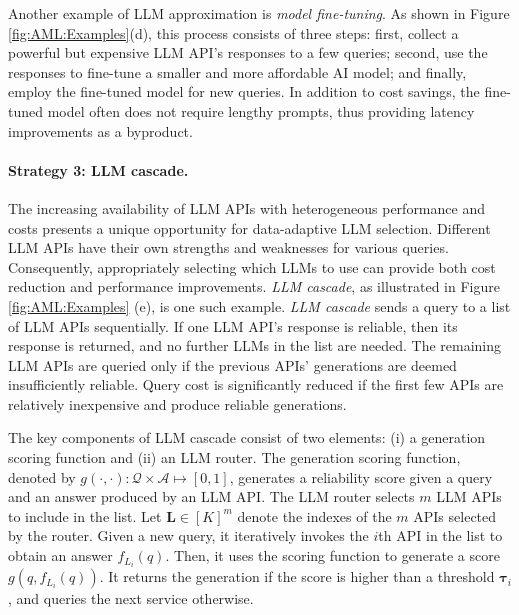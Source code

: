 \documentclass{article}
\numberwithin{equation}{section}
\newcommand{\query}{q}
\begin{document}
Another example of LLM approximation is \textit{model fine-tuning}. As shown in Figure \ref{fig:AML:Examples}(d), this process consists of three steps: first, collect a powerful but expensive LLM API's responses to a few queries; second, use the responses to fine-tune a smaller and more affordable AI model; and finally, employ the fine-tuned model for new queries. In addition to cost savings, the fine-tuned model often does not require lengthy prompts, thus providing latency improvements as a byproduct.


\paragraph{Strategy 3: LLM cascade.}
The increasing availability of LLM APIs with heterogeneous performance and costs presents a unique opportunity for data-adaptive LLM selection. Different LLM APIs have their own strengths and weaknesses for various queries. Consequently, appropriately selecting which LLMs to use can provide both cost reduction and performance improvements. \textit{LLM cascade}, as illustrated in Figure \ref{fig:AML:Examples} (e), is one such example. \textit{LLM cascade} sends a query to a list of LLM APIs sequentially. If one LLM API's response is reliable, then its response is returned, and no further LLMs in the list are needed. The remaining LLM APIs are queried only if the previous APIs' generations are deemed insufficiently reliable. Query cost is significantly reduced if the first few APIs are relatively inexpensive and produce reliable generations.

The key components of LLM cascade consist of two elements: (i) a generation scoring function and (ii) an LLM router. The generation scoring function, denoted by $g(\cdot,\cdot):\mathcal{Q} \times \mathcal{A}\mapsto [0,1]$, generates a reliability score given a query and an answer produced by an LLM API. The LLM router selects $m$ LLM APIs to include in the list. Let $\pmb L \in [K]^m$ denote the indexes of the $m$ APIs selected by the router. Given a new query, it iteratively invokes the $i$th API in the list to obtain an answer $f_{L_i}(\query)$. Then, it uses the scoring function to generate a score $ g(\query,f_{L_i}(\query))$. It returns the generation if the score is higher than a threshold $\pmb \tau_i$, and queries the next service otherwise.
\end{document}
